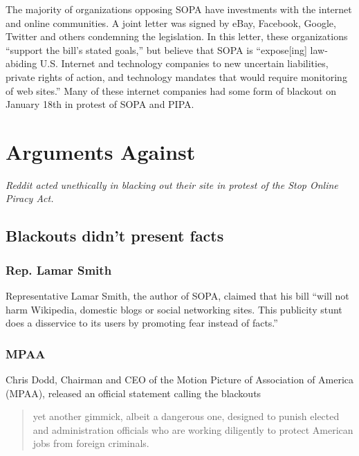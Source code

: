 \documentclass[11pt]{article}
\begin{document}
\begin{multicols}{2}
The majority of organizations opposing SOPA have investments with the internet and online communities. A joint letter was signed by eBay, Facebook, Google, Twitter and others condemning the legislation.\cite{mozilla-joint-letter} In this letter, these organizations ``support the bill's stated goals,'' but believe that SOPA is ``expose[ing] law-abiding U.S. Internet and technology companies to new uncertain liabilities, private rights of action, and technology mandates that would require monitoring of web sites.''\cite{mozilla-joint-letter} Many of these internet companies had some form of blackout on January 18th in protest of SOPA and PIPA.\cite{sopa-strike-participants}


   \section{Arguments Against}

\emph{Reddit acted unethically in blacking out their site in protest of the Stop Online Piracy Act.}

   \subsection{Blackouts didn't present facts}

   \subsubsection{Rep. Lamar Smith}

Representative Lamar Smith, the author of SOPA,\cite{sopa} claimed that his bill ``will not harm Wikipedia, domestic blogs or social networking sites. This publicity stunt does a disservice to its users by promoting fear instead of facts.''\cite{lamar-smith-publicity-stunt}

   \subsubsection{MPAA}

Chris Dodd, Chairman and CEO of the Motion Picture of Association of America (MPAA), released an official statement calling the blackouts 

\begin{quote}yet another gimmick, albeit a dangerous one, designed to punish elected and administration officials who are working diligently to protect American jobs from foreign criminals.\cite{chris-dodd-response}\end{quote}


\end{multicols}
\end{document}
